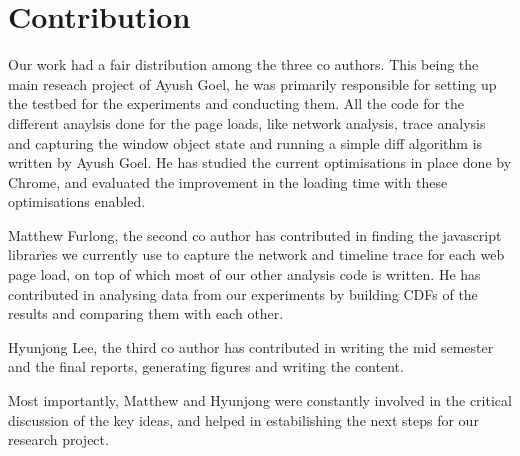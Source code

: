\section{Contribution}
\label{sec:contribution}

Our work had a fair distribution among the three co authors. 
This being the main reseach project of Ayush Goel, he was primarily 
responsible for setting up the testbed for the experiments and conducting them. 
All the code for the different anaylsis done for the page loads, like network
analysis, trace analysis and capturing the window object state and running
a simple diff algorithm is written by Ayush Goel. He has studied the current 
optimisations in place done by Chrome, and evaluated the improvement in the
loading time with these optimisations enabled. 

Matthew Furlong, the second co author has contributed in finding 
the javascript libraries we currently use to capture the network
and timeline trace for each web page load, on top of which most of 
our other analysis code is written. He has contributed in analysing
data from our experiments by building CDFs of the results and 
comparing them with each other. 

Hyunjong Lee, the third co author has contributed in writing the mid semester
and the final reports, generating figures and writing the content. 

Most importantly, Matthew and Hyunjong were constantly involved in the
critical discussion of the key ideas, and helped in estabilishing the next
steps for our research project. 